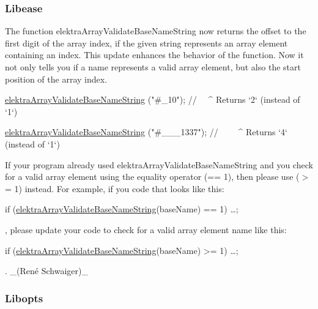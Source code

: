 \subsubsection*{Libease}


\begin{DoxyItemize}
\item The function {\ttfamily elektra\+Array\+Validate\+Base\+Name\+String} now returns the offset to the first digit of the array index, if the given string represents an array element containing an index. This update enhances the behavior of the function. Now it not only tells you if a name represents a valid array element, but also the start position of the array index.
\end{DoxyItemize}


\begin{DoxyCode}
\hyperlink{array_8c_ab2eb25a64ded91feb47e58af8e62314a}{elektraArrayValidateBaseNameString} (\textcolor{stringliteral}{"#\_10"});
\textcolor{comment}{//                                     ~~^ Returns `2` (instead of `1`)}

\hyperlink{array_8c_ab2eb25a64ded91feb47e58af8e62314a}{elektraArrayValidateBaseNameString} (\textcolor{stringliteral}{"#\_\_\_1337"});
\textcolor{comment}{//                                   ~~~~^ Returns `4` (instead of `1`)}
\end{DoxyCode}


If your program already used {\ttfamily elektra\+Array\+Validate\+Base\+Name\+String} and you check for a valid array element using the equality operator ({\ttfamily == 1}), then please use ({\ttfamily $>$= 1}) instead. For example, if you code that looks like this\+:


\begin{DoxyCode}
\textcolor{keywordflow}{if} (\hyperlink{array_8c_ab2eb25a64ded91feb47e58af8e62314a}{elektraArrayValidateBaseNameString}(baseName) == 1) …;
\end{DoxyCode}


, please update your code to check for a valid array element name like this\+:


\begin{DoxyCode}
\textcolor{keywordflow}{if} (\hyperlink{array_8c_ab2eb25a64ded91feb47e58af8e62314a}{elektraArrayValidateBaseNameString}(baseName) >= 1) …;
\end{DoxyCode}


. \+\_\+(René Schwaiger)\+\_\+

\subsubsection*{Libopts}


